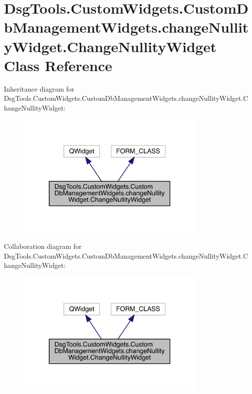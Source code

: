 \hypertarget{class_dsg_tools_1_1_custom_widgets_1_1_custom_db_management_widgets_1_1change_nullity_widget_1_1_change_nullity_widget}{}\section{Dsg\+Tools.\+Custom\+Widgets.\+Custom\+Db\+Management\+Widgets.\+change\+Nullity\+Widget.\+Change\+Nullity\+Widget Class Reference}
\label{class_dsg_tools_1_1_custom_widgets_1_1_custom_db_management_widgets_1_1change_nullity_widget_1_1_change_nullity_widget}


Inheritance diagram for Dsg\+Tools.\+Custom\+Widgets.\+Custom\+Db\+Management\+Widgets.\+change\+Nullity\+Widget.\+Change\+Nullity\+Widget\+:
\nopagebreak
\begin{figure}[H]
\begin{center}
\leavevmode
\includegraphics[width=266pt]{class_dsg_tools_1_1_custom_widgets_1_1_custom_db_management_widgets_1_1change_nullity_widget_1_1d04d6f8db3416b50bf564c57d51ab761}
\end{center}
\end{figure}


Collaboration diagram for Dsg\+Tools.\+Custom\+Widgets.\+Custom\+Db\+Management\+Widgets.\+change\+Nullity\+Widget.\+Change\+Nullity\+Widget\+:
\nopagebreak
\begin{figure}[H]
\begin{center}
\leavevmode
\includegraphics[width=266pt]{class_dsg_tools_1_1_custom_widgets_1_1_custom_db_management_widgets_1_1change_nullity_widget_1_1b60dad8ea90be14b2295ceff25471e17}
\end{center}
\end{figure}
